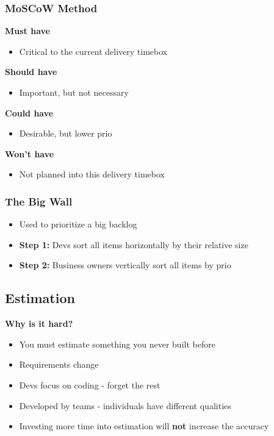 \subsubsection{MoSCoW Method}
\textbf{Must have}
\begin{itemize}
    \item Critical to the current delivery timebox
\end{itemize}
\textbf{Should have}
\begin{itemize}
    \item Important, but not necessary
\end{itemize}
\textbf{Could have}
\begin{itemize}
    \item Desirable, but lower prio
\end{itemize}
\textbf{Won't have}
\begin{itemize}
    \item Not planned into this delivery timebox
\end{itemize}

\subsubsection{The Big Wall}
\begin{itemize}
    \item Used to prioritize a big backlog
    \item \textbf{Step 1:} Devs sort all items horizontally by their relative size
    \item \textbf{Step 2:} Business owners vertically sort all items by prio
\end{itemize}

\subsection{Estimation}
\textbf{Why is it hard?}
\begin{itemize}
    \item You must estimate something you never built before
    \item Requirements change
    \item Devs focus on coding - forget the rest
    \item Developed by teams - individuals have different qualities
    \item Investing more time into estimation will \textbf{not} increase the accuracy
\end{itemize}

